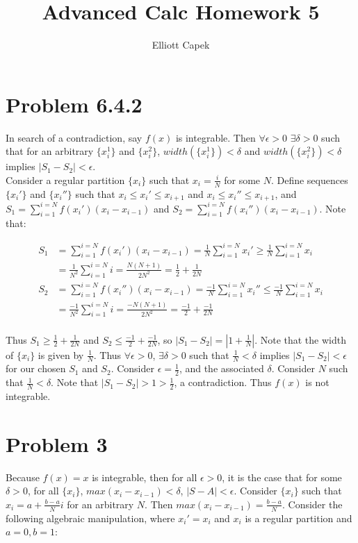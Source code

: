 \documentclass[10pt]{article} %
\title{Advanced Calc Homework 5}
\author{Elliott Capek}
\begin{document}
\maketitle{}

\section{Problem 6.4.2}
In search of a contradiction, say $f(x)$ is integrable. Then $\forall \epsilon > 0$ $\exists \delta>0$ such that for an arbitrary $\{x_i^1\}$ and $\{x_i^2\}$, $width(\{x_i^1\})<\delta$ and $width(\{x_i^2\})<\delta$ implies $|S_1-S_2|<\epsilon$.\\

Consider a regular partition $\{x_i\}$ such that $x_i = \frac{i}{N}$ for some $N$. Define sequences $\{x_i'\}$ and $\{x_i''\}$ such that $x_i \leq x_i' \leq x_{i+1}$ and $x_i \leq x_i'' \leq x_{i+1}$, and $S_1 = \sum_{i=1}^{i=N}f(x_i')\left(x_i-x_{i-1}\right)$ and $S_2 = \sum_{i=1}^{i=N}f(x_i'')\left(x_i-x_{i-1}\right)$. Note that:

\begin{align*}
  S_1 &= \sum_{i=1}^{i=N}f(x_i')(x_i-x_{i-1}) = \frac{1}{N}\sum_{i=1}^{i=N}x_i' \geq \frac{1}{N}\sum_{i=1}^{i=N}x_i\\
  &= \frac{1}{N^2}\sum_{i=1}^{i=N}i = \frac{N(N+1)}{2N^2} = \frac{1}{2} + \frac{1}{2N}\\
  S_2 &= \sum_{i=1}^{i=N}f(x_i'')(x_i-x_{i-1}) = \frac{-1}{N}\sum_{i=1}^{i=N}x_i'' \leq \frac{-1}{N}\sum_{i=1}^{i=N}x_i\\
  &= \frac{-1}{N^2}\sum_{i=1}^{i=N}i = \frac{-N(N+1)}{2N^2} = \frac{-1}{2} + \frac{-1}{2N}\\
\end{align*}

Thus $S_1 \geq \frac{1}{2} + \frac{1}{2N}$ and $S_2 \leq \frac{-1}{2} + \frac{-1}{2N}$, so $|S_1-S_2| = |1 + \frac{1}{N}|$. Note that the width of $\{x_i\}$ is given by $\frac{1}{N}$. Thus $\forall \epsilon>0$, $\exists \delta > 0$ such that $\frac{1}{N}<\delta$ implies $|S_1-S_2|<\epsilon$ for our chosen $S_1$ and $S_2$. Consider $\epsilon = \frac{1}{2}$, and the associated $\delta$. Consider $N$ such that $\frac{1}{N}<\delta$. Note that $|S_1-S_2|>1>\frac{1}{2}$, a contradiction. Thus $f(x)$ is not integrable.\\

\section{Problem 3}
Because $f(x) = x$ is integrable, then for all $\epsilon > 0$, it is the case that for some $\delta > 0$, for all $\{x_i\}$, $max(x_i-x_{i-1})<\delta$, $|S - A| < \epsilon$. Consider $\{x_i\}$ such that $x_i = a + \frac{b-a}{N}i$ for an arbitrary $N$. Then $max(x_i-x_{i-1}) = \frac{b-a}{N}$. Consider the following algebraic manipulation, where $x_i' = x_i$ and $x_i$ is a regular partition and $a=0, b=1$:
\end{document}
